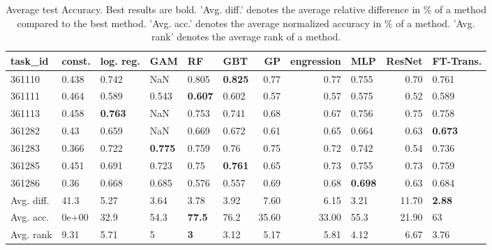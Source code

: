\begin{table}[ht!]
\centering
\begingroup\footnotesize
\begin{tabular}{llllllrrlrl}
  \hline
\hline
task\_id & const. & log. reg. & GAM & RF & GBT & GP & engression & MLP & ResNet & FT-Trans. \\ 
  \hline
361110 & 0.438 & 0.742 & NaN & 0.805 & \textbf{0.825} & 0.77 & 0.77 & 0.755 & 0.70 & 0.761 \\ 
  361111 & 0.464 & 0.589 & 0.543 & \textbf{0.607} & 0.602 & 0.57 & 0.57 & 0.575 & 0.52 & 0.589 \\ 
  361113 & 0.458 & \textbf{0.763} & NaN & 0.753 & 0.741 & 0.68 & 0.67 & 0.756 & 0.75 & 0.758 \\ 
  361282 & 0.43 & 0.659 & NaN & 0.669 & 0.672 & 0.61 & 0.65 & 0.664 & 0.63 & \textbf{0.673} \\ 
  361283 & 0.366 & 0.722 & \textbf{0.775} & 0.759 & 0.76 & 0.75 & 0.72 & 0.742 & 0.54 & 0.736 \\ 
  361285 & 0.451 & 0.691 & 0.723 & 0.75 & \textbf{0.761} & 0.65 & 0.73 & 0.755 & 0.73 & 0.759 \\ 
  361286 & 0.36 & 0.668 & 0.685 & 0.576 & 0.557 & 0.69 & 0.68 & \textbf{0.698} & 0.63 & 0.684 \\ 
   \hline
Avg. diff. & 41.3 & 5.27 & 3.64 & 3.78 & 3.92 & 7.60 & 6.15 & 3.21 & 11.70 & \textbf{2.88} \\ 
  Avg. acc. & 0e+00 & 32.9 & 54.3 & \textbf{77.5} & 76.2 & 35.60 & 33.00 & 55.3 & 21.90 & 63 \\ 
  Avg. rank & 9.31 & 5.71 & 5 & \textbf{3} & 3.12 & 5.17 & 5.81 & 4.12 & 6.67 & 3.76 \\ 
   \hline
\hline
\end{tabular}
\endgroup
\caption{Average test Accuracy. 
                  Best results are bold. 
                  'Avg. diff.' denotes the average relative difference in \% of a method compared to the best method.
                  'Avg. acc.' denotes the average normalized accuracy in \% of a method.
                  'Avg. rank' denotes the average rank of a method.} 
\label{TABLES/table_results_Accuracy_num_and_cat_features}
\end{table}
